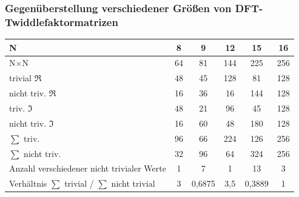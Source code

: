 \begin{frame}\frametitle{Gegenüberstellung verschiedener Größen von DFT-Twiddlefaktormatrizen}
  \begingroup
  \renewcommand*{\arraystretch}{1.2} %
  \begin{table}[!ht]
  \centering
   \begin{tabular}{lccccc}
   \hline
    N							& 8	& 9	& 12	& 15		& 16 \\
    \hline
    N$\times$N						& 64	& 81	& 144	& 225		& 256 \\
    \rowcolor{lightgray}
    trivial $\Re$ 					& 48	& 45	& 128	& 81		& 128 \\
    \rowcolor{lightgray}
    nicht triv. $\Re$					& 16	& 36	& 16	& 144		& 128 \\
    triv. $\Im$ 					& 48	& 21	& 96	& 45		& 128 \\
    nicht triv. $\Im$ 					& 16	& 60	& 48	& 180		& 128 \\
    \rowcolor{lightgray}
    $\sum$ triv. 					& 96	& 66	& 224	& 126		& 256 \\
    \rowcolor{lightgray}
    $\sum$ nicht triv. 					& 32	& 96	& 64	& 324		& 256 \\
    Anzahl verschiedener nicht trivialer Werte          & 1     & 7     & 1     & 13            & 3 \\
    Verhältnis  $\sum$ trivial / $\sum$ nicht trivial	& 3	& 0,6875& 3,5	& 0,3889	& 1\\
    \hline
   \end{tabular}
   \label{tab:DFT-TwiddlefaktorMatrizenBewertung}
  \end{table}
 \endgroup
 \vspace{1cm}
\end{frame}



